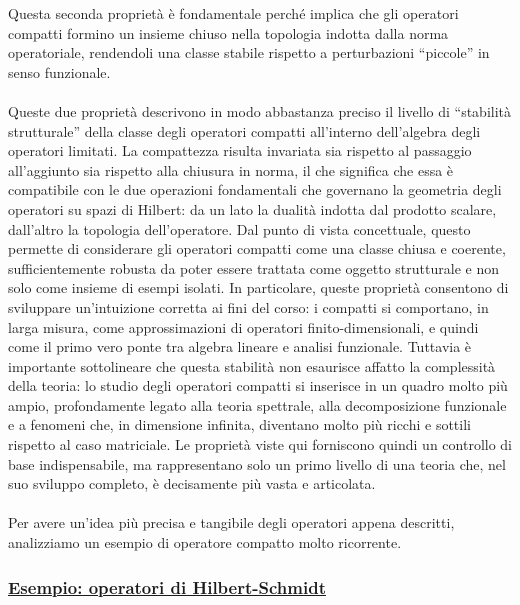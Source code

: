 \documentclass[a4paper,12pt]{report}
\begin{document}
Questa seconda proprietà è fondamentale perché implica che gli operatori compatti formino un insieme chiuso nella topologia indotta dalla norma operatoriale, rendendoli una classe stabile rispetto a perturbazioni “piccole” in senso funzionale.
\\
\\Queste due proprietà descrivono in modo abbastanza preciso il livello di “stabilità strutturale” della classe degli operatori compatti all’interno dell’algebra degli operatori limitati. La compattezza risulta invariata sia rispetto al passaggio all’aggiunto sia rispetto alla chiusura in norma, il che significa che essa è compatibile con le due operazioni fondamentali che governano la geometria degli operatori su spazi di Hilbert: da un lato la dualità indotta dal prodotto scalare, dall’altro la topologia dell’operatore.
Dal punto di vista concettuale, questo permette di considerare gli operatori compatti come una classe chiusa e coerente, sufficientemente robusta da poter essere trattata come oggetto strutturale e non solo come insieme di esempi isolati. In particolare, queste proprietà consentono di sviluppare un’intuizione corretta ai fini del corso: i compatti si comportano, in larga misura, come approssimazioni di operatori finito-dimensionali, e quindi come il primo vero ponte tra algebra lineare e analisi funzionale.
Tuttavia è importante sottolineare che questa stabilità non esaurisce affatto la complessità della teoria: lo studio degli operatori compatti si inserisce in un quadro molto più ampio, profondamente legato alla teoria spettrale, alla decomposizione funzionale e a fenomeni che, in dimensione infinita, diventano molto più ricchi e sottili rispetto al caso matriciale. Le proprietà viste qui forniscono quindi un controllo di base indispensabile, ma rappresentano solo un primo livello di una teoria che, nel suo sviluppo completo, è decisamente più vasta e articolata.
\\
\\Per avere un'idea più precisa e tangibile degli operatori appena descritti, analizziamo un esempio di operatore compatto molto ricorrente.

\newpage



\subsubsection{\underline{Esempio: operatori di Hilbert-Schmidt}}
\end{document}
